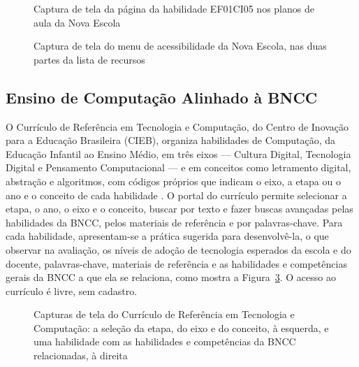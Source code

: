 \begin{figure}[H]
    \centering
    \caption{Captura de tela da página da habilidade EF01CI05 nos planos de aula da Nova Escola}
    \label{fig-sw-novaescola}
\end{figure}

\begin{figure}[H]
    \centering
    \caption[Captura de tela do menu de acessibilidade da Nova Escola]{Captura de tela do menu de acessibilidade da Nova Escola, nas duas partes da lista de recursos}
    \label{fig-sw-novaescola-acess}
    \hspace{0.8cm}%
\end{figure}


\subsection{Ensino de Computação Alinhado à BNCC}
\label{sec-referencial-softwares-computacao}

O Currículo de Referência em Tecnologia e Computação, do Centro de Inovação para a Educação Brasileira (CIEB), organiza habilidades de Computação, da Educação Infantil ao Ensino Médio, em três eixos --- Cultura Digital, Tecnologia Digital e Pensamento Computacional --- e em conceitos como letramento digital, abstração e algoritmos, com códigos próprios que indicam o eixo, a etapa ou o ano e o conceito de cada habilidade \cite{cieb2026curriculo}. O portal do currículo permite selecionar a etapa, o ano, o eixo e o conceito, buscar por texto e fazer buscas avançadas pelas habilidades da BNCC, pelos materiais de referência e por palavras-chave. Para cada habilidade, apresentam-se a prática sugerida para desenvolvê-la, o que observar na avaliação, os níveis de adoção de tecnologia esperados da escola e do docente, palavras-chave, materiais de referência e as habilidades e competências gerais da BNCC a que ela se relaciona, como mostra a Figura~\ref{fig-sw-cieb}. O acesso ao currículo é livre, sem cadastro.

\begin{figure}[H]
    \centering
    \caption[Capturas de tela do Currículo de Referência em Tecnologia e Computação]{Capturas de tela do Currículo de Referência em Tecnologia e Computação: a seleção da etapa, do eixo e do conceito, à esquerda, e uma habilidade com as habilidades e competências da BNCC relacionadas, à direita}
    \label{fig-sw-cieb}
    \hfill
\end{figure}

